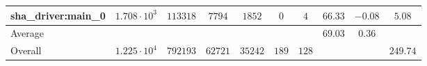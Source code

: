 \begin{tabular}{|l|c|c|c|c|c|c|c|c|c|}
sha\_driver:main\_0     & $ 1.708 \cdot 10^{3} $ & $ 113318 $ & $ 7794  $ & $ 1852  $ & $ 0   $ & $ 4   $ & $ 66.33       $ & $ -0.08   $ & $ 5.08    $ \\
\hline
Average                 & $                    $ & $        $ & $       $ & $       $ & $     $ & $     $ & $ 69.03       $ & $ 0.36    $ & $         $ \\
\hline
Overall                 & $ 1.225 \cdot 10^{4} $ & $ 792193 $ & $ 62721 $ & $ 35242 $ & $ 189 $ & $ 128 $ & $             $ & $         $ & $ 249.74  $ \\
\hline
\end{tabular}
